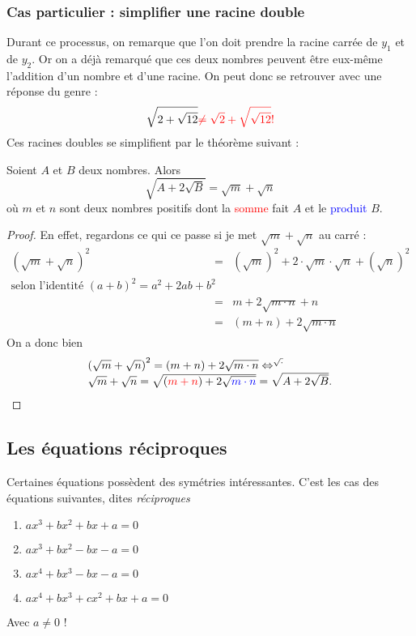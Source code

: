 \subsubsection{Cas particulier : simplifier une  racine double}

Durant ce processus, on remarque que l'on doit prendre la racine carrée de $y_1$ et de $y_2$. Or on a déjà remarqué que ces deux nombres peuvent être eux-même l'addition d'un nombre et d'une racine. On peut donc se retrouver avec une réponse du genre :
$$
\sqrt{2+\sqrt{12}} \textcolor{red}{\neq \sqrt{2} + \sqrt{\sqrt{12}} ! }
$$
Ces racines doubles se simplifient par le théorème suivant :
\begin{theoreme}
Soient $A$ et $B$ deux nombres. Alors 
$$
\sqrt{A+2\sqrt{B}} = \sqrt{m}+\sqrt{n}
$$
où $m$ et $n$ sont deux nombres positifs dont la \textcolor{red}{somme} fait $A$ et le \textcolor{blue}{produit} $B$.
\end{theoreme}

\begin{proof}
En effet, regardons ce qui ce passe si je met $\sqrt{m}+ \sqrt{n}$ au carré :
$$
\begin{array}{lcl}
\left(\sqrt{m}+ \sqrt{n} \right)^2 &=& \left(\sqrt{m}\right)^2 + 2\cdot \sqrt{m} \cdot \sqrt{n} + \left(\sqrt{n}\right)^2\\
\mbox{selon l'identité } (a+b)^2 = a^2 + 2ab + b^2&&\\
&=& m + 2 \sqrt{m\cdot n} + n \\
&=& (m+n) + 2 \sqrt{m\cdot n}
\end{array}
$$
On a donc bien 
$$
\begin{array}{l}
\left(\sqrt{m}+ \sqrt{n} \right)^2 = (m+n) + 2 \sqrt{m\cdot n} \Leftrightarrow^{\sqrt{\cdot}}\\
\sqrt{m}+ \sqrt{n} = \sqrt{(\textcolor{red}{m+n}) + 2 \sqrt{\textcolor{blue}{m\cdot n}}} = \sqrt{A+2\sqrt{B}}.
\end{array}
$$
\end{proof}

\subsection{Les équations réciproques}

Certaines équations possèdent des symétries intéressantes. C'est les cas des équations suivantes, dites \emph{réciproques}
\begin{enumerate}
\item $ ax^3+ bx^2+ bx+ a =0$ \label{reciproque1}
\item $ ax^3+ bx^2- bx- a =0$ \label{reciproque2}
\item $ax^4+ bx^3 -bx- a = 0$ \label{reciproque3}
\item $ax^4+ bx^3+ cx^2+ bx+ a =0 $\label{reciproque4}
\end{enumerate}
Avec $a\neq 0$ !

